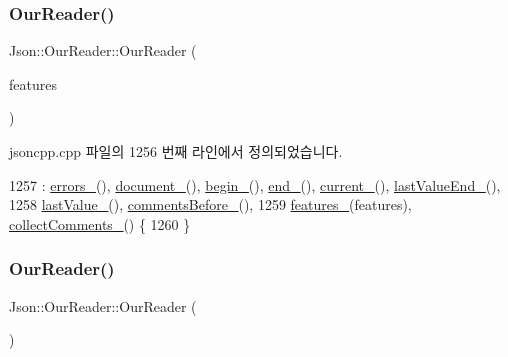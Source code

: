 \subsubsection{\texorpdfstring{Our\+Reader()}{OurReader()}\hspace{0.1cm}{\footnotesize\ttfamily [1/2]}}
{\footnotesize\ttfamily Json\+::\+Our\+Reader\+::\+Our\+Reader (\begin{DoxyParamCaption}\item[{\hyperlink{class_json_1_1_our_features}{Our\+Features} const \&}]{features }\end{DoxyParamCaption})}



jsoncpp.\+cpp 파일의 1256 번째 라인에서 정의되었습니다.


\begin{DoxyCode}
1257     : \hyperlink{class_json_1_1_our_reader_afb76b68ba1ab68fe09cf2838e3d4898d}{errors\_}(), \hyperlink{class_json_1_1_our_reader_a726230af83d22d25e0c76cec3408ecf1}{document\_}(), \hyperlink{class_json_1_1_our_reader_a9bda9d72335d52cd06e65f9eca3f70f5}{begin\_}(), \hyperlink{class_json_1_1_our_reader_ab1f69b0260c27a0d2d65dc56e42c8f9d}{end\_}(), 
      \hyperlink{class_json_1_1_our_reader_a5211fbbba94be80a22dd2317c621efcc}{current\_}(), \hyperlink{class_json_1_1_our_reader_a101eadc45e01c60628b53f0db3d13482}{lastValueEnd\_}(),
1258       \hyperlink{class_json_1_1_our_reader_a9f994b6a2227c5d96e6ed6cbc74ed251}{lastValue\_}(), \hyperlink{class_json_1_1_our_reader_a9c53e77e290eb9081298210a955fda6a}{commentsBefore\_}(),
1259       \hyperlink{class_json_1_1_our_reader_a2714302d5cc54ca2ce4118ea51c0397a}{features\_}(features), \hyperlink{class_json_1_1_our_reader_a259f6ac988da2894bcafc670e42f73ad}{collectComments\_}() \{
1260 \}
\end{DoxyCode}
\mbox{\label{class_json_1_1_our_reader_aee013005522c0d34d2e14962851487ac}} 
\subsubsection{\texorpdfstring{Our\+Reader()}{OurReader()}\hspace{0.1cm}{\footnotesize\ttfamily [2/2]}}
{\footnotesize\ttfamily Json\+::\+Our\+Reader\+::\+Our\+Reader (\begin{DoxyParamCaption}\item[{\hyperlink{class_json_1_1_our_reader}{Our\+Reader} const \&}]{ }\end{DoxyParamCaption})\hspace{0.3cm}{\ttfamily [private]}}



